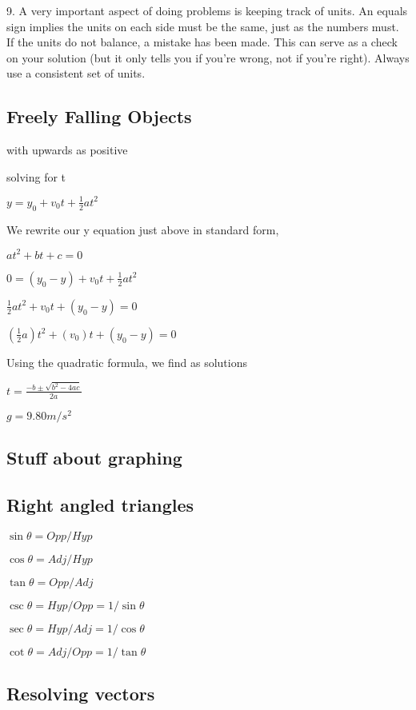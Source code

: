 \documentclass{extarticle}
\begin{document}
\begin{tcolorbox}[enhanced jigsaw,sharp corners,coltext=black,colback=BurntOrange!25!white,boxrule=0pt,breakable,size=minimal]
9. A very important aspect of doing problems is keeping track of units. An equals sign implies the units on each side must be the same, just as the numbers must. If the units do not balance, a mistake has been made. This can serve as a check on your solution (but it only tells you if you’re wrong, not if you’re right). Always use a consistent set of units.






\subsection{Freely Falling Objects}

with upwards as positive

solving for t

$y = y_0 + v_0t + \frac{1}{2}at^2$

We rewrite our y equation just above in standard form,

$at^2 + bt + c = 0$

$0 = (y_0 - y) + v_0t + \frac{1}{2}at^2$

$\frac{1}{2}at^2 + v_0t + (y_0 - y) = 0$

$(\frac{1}{2}a)t^2 + (v_0)t + (y_0 - y) = 0$

Using the quadratic formula, we find as solutions

$t=\frac{-b\pm\sqrt{b^2-4ac}}{2a}$

$g = 9.80 m/s^2$


\subsection{Stuff about graphing}


\subsection{Right angled triangles}

$\sin\theta=Opp/Hyp$
	
$\cos\theta=Adj/Hyp$	
	
$\tan\theta=Opp/Adj$	


$\csc\theta=Hyp/Opp=1/\sin\theta$

$\sec\theta=Hyp/Adj=1/\cos\theta$

$\cot\theta=Adj/Opp=1/\tan\theta$


\subsection{Resolving vectors}


\end{tcolorbox}
\end{document}
